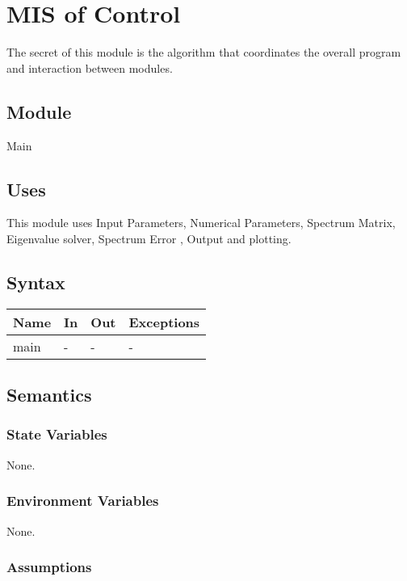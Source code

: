 \documentclass[12pt, titlepage]{article}
\begin{document}
\newpage 

\section{MIS of Control} 

The secret of this module is the algorithm that coordinates the overall program 
and 
interaction between modules.

\subsection{Module}

Main

\subsection{Uses}

This module uses Input Parameters, Numerical Parameters, Spectrum Matrix, 
Eigenvalue solver, Spectrum Error , Output and plotting.

\subsection{Syntax}

\begin{center}
	\begin{tabular}{p{2cm} p{6cm} p{6cm} p{3cm}}
		\hline
		\textbf{Name} & \textbf{In} & \textbf{Out} & \textbf{Exceptions} \\
		\hline
		main & - & - & - \\ 
		\hline
	\end{tabular}
\end{center}

\subsection{Semantics}

\subsubsection{State Variables}

None.

\subsubsection{Environment Variables}

None.

\subsubsection{Assumptions}
\end{document}
